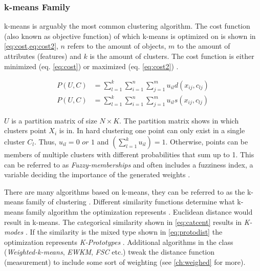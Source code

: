 \documentclass[../report.tex]{subfiles}
\begin{document}
\subsubsection{k-means Family}
\label{sub:family}
k-means is arguably the most common clustering algorithm. The cost function (also known as objective function) of which k-means is optimized on is shown in \cref{eq:cost,eq:cost2}, $n$ refers to the amount of objects, $m$ to the amount of attributes (features) and $k$ is the amount of clusters. The cost function is either minimized (eq. \ref{eq:cost}) or maximized (eq. \ref{eq:cost2}) \cite{huang2005automated}.




\begin{align}
  \label{eq:cost}
  P(U,C) &= \sum^k_{l=1} \sum^n_{i=1} \sum^m_{j=1} u_{il} d(x_{ij},c_{lj}) \\
  \label{eq:cost2}
  P(U,C) &= \sum^k_{l=1} \sum^n_{i=1} \sum^m_{j=1} u_{il} s(x_{ij},c_{lj})
\end{align}

$U$ is a partition matrix of size $N \times K$. The partition matrix shows in which clusters point $X_i$ is in.  In hard clustering one point can only exist in a single cluster $C_l$. Thus, $u_{il} = 0 \textit{ or } 1$ and $(\sum_{ l=1 }^{ k } u_{il}) = 1$. Otherwise, points can be members of multiple clusters with different probabilities that sum up to 1. This can be referred to as \textit{Fuzzy-memberships} and often includes a fuzziness index, a variable deciding the importance of the generated weights \cite{Gan2006}.

There are many algorithms based on k-means, they can be referred to as the k-means family of clustering \cite{Huang1998}. Different similarity functions determine what k-means family algorithm the optimization represents \cite{huang2005automated}. Euclidean distance would result in k-means. The categorical similarity shown in \cref{eq:catcent} results in \textit{K-modes} \cite{Ng1999}. If the similarity is the mixed type shown in \cref{eq:protodist} the optimization represents \textit{K-Prototypes} \cite{Huang97clusteringlarge}. Additional algorithms in the class (\textit{Weighted-k-means}, \textit{EWKM}, \textit{FSC} etc.) \cite{huang2005automated, Jing2007, Gan2016} tweak the distance function (measurement) to include some sort of weighting (see \cref{ch:weighed} for more).
\end{document}
